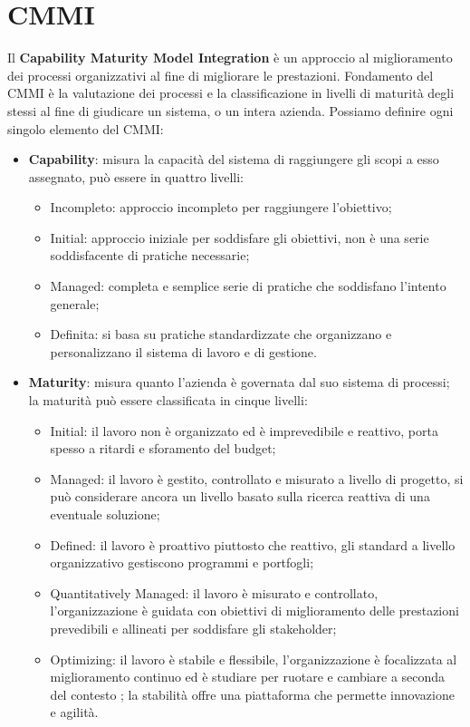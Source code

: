 \section{CMMI}\label{CMMISection}
Il \textbf{Capability Maturity Model Integration} è un approccio al miglioramento dei processi organizzativi al fine di migliorare le prestazioni. Fondamento del CMMI è la valutazione dei processi e la classificazione in livelli di maturità degli stessi al fine di giudicare un sistema, o un intera azienda. Possiamo definire ogni singolo elemento del CMMI:
\begin{itemize}
	\item \textbf{Capability}: misura la capacità del sistema di raggiungere gli scopi a esso assegnato, può essere  in quattro livelli:
	\begin{itemize}
		\item Incompleto: approccio incompleto per raggiungere l'obiettivo;
		\item Initial: approccio iniziale per soddisfare gli obiettivi, non è una serie soddisfacente di pratiche necessarie;
		\item Managed: completa e semplice serie di pratiche che soddisfano l'intento generale;
		\item Definita: si basa su pratiche standardizzate che organizzano e personalizzano il sistema di lavoro e di gestione.
	\end{itemize}	 
	\item \textbf{Maturity}: misura quanto l'azienda è governata dal suo sistema di processi; la maturità può essere classificata in cinque livelli:
	\begin{itemize}
		\item Initial: il lavoro non è organizzato ed è imprevedibile e reattivo, porta spesso a ritardi e sforamento del budget;
		\item Managed: il lavoro è gestito, controllato e misurato a livello di progetto, si può considerare ancora un livello basato sulla ricerca reattiva di una eventuale soluzione;
		\item Defined: il lavoro è proattivo piuttosto che reattivo, gli standard a livello organizzativo gestiscono programmi e portfogli;
		\item Quantitatively Managed: il lavoro è misurato e controllato, l'organizzazione è guidata con obiettivi di miglioramento delle prestazioni prevedibili e allineati per soddisfare gli stakeholder;
		\item Optimizing: il lavoro è stabile e flessibile, l'organizzazione è focalizzata al miglioramento continuo ed è studiare per ruotare e cambiare a seconda del contesto ; la stabilità offre una piattaforma che permette innovazione e agilità.

\end{itemize}
\end{itemize}
